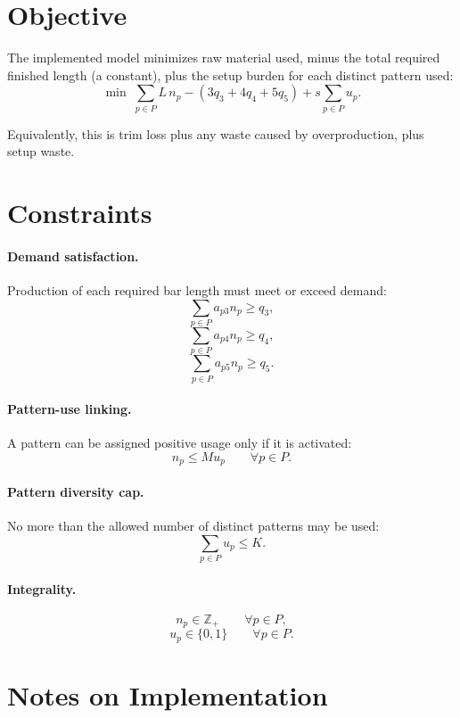 \section*{Objective}

The implemented model minimizes raw material used, minus the total required finished length (a constant), plus the setup burden for each distinct pattern used:
\[
\min \;
\sum_{p \in P} L\,n_p
-\left(3q_3+4q_4+5q_5\right)
+s\sum_{p \in P} u_p.
\]

Equivalently, this is trim loss plus any waste caused by overproduction, plus setup waste.

\section*{Constraints}

\paragraph{Demand satisfaction.}
Production of each required bar length must meet or exceed demand:
\[
\sum_{p \in P} a_{p3} n_p \ge q_3,
\]
\[
\sum_{p \in P} a_{p4} n_p \ge q_4,
\]
\[
\sum_{p \in P} a_{p5} n_p \ge q_5.
\]

\paragraph{Pattern-use linking.}
A pattern can be assigned positive usage only if it is activated:
\[
n_p \le M u_p
\qquad \forall p \in P.
\]

\paragraph{Pattern diversity cap.}
No more than the allowed number of distinct patterns may be used:
\[
\sum_{p \in P} u_p \le K.
\]

\paragraph{Integrality.}
\[
n_p \in \mathbb{Z}_+ \qquad \forall p \in P,
\]
\[
u_p \in \{0,1\} \qquad \forall p \in P.
\]

\section*{Notes on Implementation}

